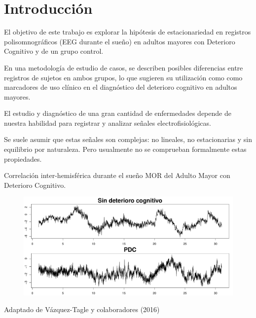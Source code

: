 \chapter*{Introducci\'on}

El objetivo de este trabajo es explorar la hip\'otesis de estacionariedad en registros
polisomnogr\'aficos (EEG durante el sue\~no) en adultos mayores con Deterioro Cognitivo y de
un grupo control.

En una metodolog\'ia de estudio de casos, se describen posibles diferencias entre registros 
de sujetos en ambos grupos, lo que sugieren su utilizaci\'on como
como marcadores de uso cl\'inico en el diagn\'ostico del deterioro cognitivo en adultos mayores.

El estudio y diagnóstico de una gran cantidad de enfermedades depende de nuestra habilidad para
registrar y analizar se\~nales electrofisiol\'ogicas. 

Se suele asumir que estas se\~nales son complejas: no lineales, no estacionarias y sin equilibrio 
por naturaleza. Pero usualmente no se comprueban formalmente estas propiedades.

Correlaci\'on inter-hemisf\'erica durante el sueño MOR del Adulto Mayor con Deterioro Cognitivo.

\begin{figure}[h]
\centering
\includegraphics[width=.8\linewidth]{graficaintro.pdf}
\end{figure}

Adaptado de V\'azquez-Tagle y colaboradores (2016)


